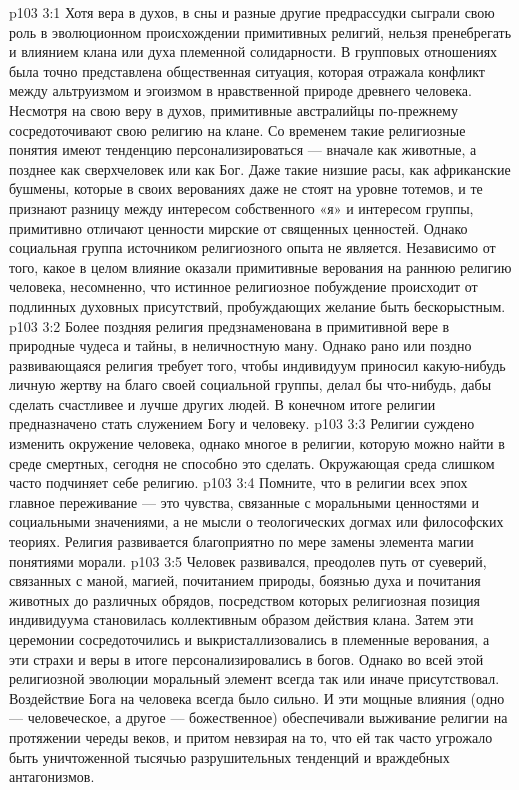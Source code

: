 \vs p103 3:1 Хотя вера в духов, в сны и разные другие предрассудки сыграли свою роль в эволюционном происхождении примитивных религий, нельзя пренебрегать и влиянием клана или духа племенной солидарности. В групповых отношениях была точно представлена общественная ситуация, которая отражала конфликт между альтруизмом и эгоизмом в нравственной природе древнего человека. Несмотря на свою веру в духов, примитивные австралийцы по\hyp{}прежнему сосредоточивают свою религию на клане. Со временем такие религиозные понятия имеют тенденцию персонализироваться --- вначале как животные, а позднее как сверхчеловек или как Бог. Даже такие низшие расы, как африканские бушмены, которые в своих верованиях даже не стоят на уровне тотемов, и те признают разницу между интересом собственного «я» и интересом группы, примитивно отличают ценности мирские от священных ценностей. Однако социальная группа источником религиозного опыта не является. Независимо от того, какое в целом влияние оказали примитивные верования на раннюю религию человека, несомненно, что истинное религиозное побуждение происходит от подлинных духовных присутствий, пробуждающих желание быть бескорыстным.
\vs p103 3:2 \pc Более поздняя религия предзнаменована в примитивной вере в природные чудеса и тайны, в неличностную ману. Однако рано или поздно развивающаяся религия требует того, чтобы индивидуум приносил какую\hyp{}нибудь личную жертву на благо своей социальной группы, делал бы что\hyp{}нибудь, дабы сделать счастливее и лучше других людей. В конечном итоге религии предназначено стать служением Богу и человеку.
\vs p103 3:3 Религии суждено изменить окружение человека, однако многое в религии, которую можно найти в среде смертных, сегодня не способно это сделать. Окружающая среда слишком часто подчиняет себе религию.
\vs p103 3:4 \pc Помните, что в религии всех эпох главное переживание --- это чувства, связанные с моральными ценностями и социальными значениями, а не мысли о теологических догмах или философских теориях. Религия развивается благоприятно по мере замены элемента магии понятиями морали.
\vs p103 3:5 Человек развивался, преодолев путь от суеверий, связанных с маной, магией, почитанием природы, боязнью духа и почитания животных до различных обрядов, посредством которых религиозная позиция индивидуума становилась коллективным образом действия клана. Затем эти церемонии сосредоточились и выкристаллизовались в племенные верования, а эти страхи и веры в итоге персонализировались в богов. Однако во всей этой религиозной эволюции моральный элемент всегда так или иначе присутствовал. Воздействие Бога на человека всегда было сильно. И эти мощные влияния (одно --- человеческое, а другое --- божественное) обеспечивали выживание религии на протяжении череды веков, и притом невзирая на то, что ей так часто угрожало быть уничтоженной тысячью разрушительных тенденций и враждебных антагонизмов.
